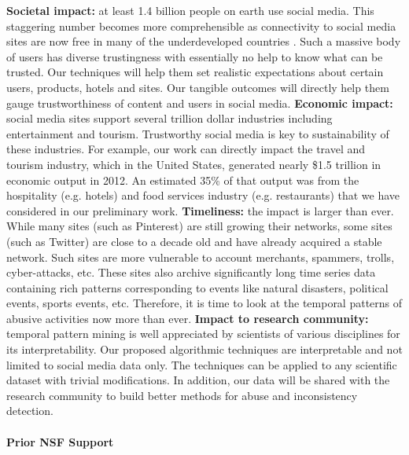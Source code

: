 \textbf{Societal impact:} at least 1.4 billion people on earth use social media. This staggering number becomes more comprehensible as connectivity to social media sites are now free in many of the underdeveloped countries \cite{Zuckerberg}. Such a massive body of users has diverse trustingness with essentially no help to know what can be trusted. Our techniques will help them set realistic expectations about certain users, products, hotels and sites. Our tangible outcomes will directly help them gauge trustworthiness of content and users in social media.
\textbf{Economic impact:} social media sites support several trillion dollar industries including entertainment and tourism. Trustworthy social media is key to sustainability of these industries. For example, our work can directly impact the travel and tourism industry, which in the United States, generated nearly \$1.5 trillion in economic output in 2012. An estimated 35\% of that output was from the hospitality (e.g. hotels) and food services industry (e.g. restaurants) \cite{hospitality} that we have considered in our preliminary work. 
\textbf{Timeliness:} the impact is larger than ever. While many sites (such as Pinterest) are still growing their networks, some sites (such as Twitter) are close to a decade old and have already acquired a stable network.
Such sites are more vulnerable to account merchants, spammers, trolls, cyber-attacks, etc. These sites also archive significantly long time series data containing rich patterns corresponding to events like natural disasters, political events, sports events, etc. Therefore, it is time to look at the temporal patterns of abusive activities now more than ever.
\textbf{Impact to research community:} temporal pattern mining is well appreciated by scientists of various disciplines for its interpretability. Our proposed algorithmic techniques are interpretable and not limited to social media data only. The techniques can be applied to any scientific dataset with trivial modifications. In addition, our data will be shared with the research community to build better methods for abuse and inconsistency detection.





\paragraph{Prior NSF Support}


